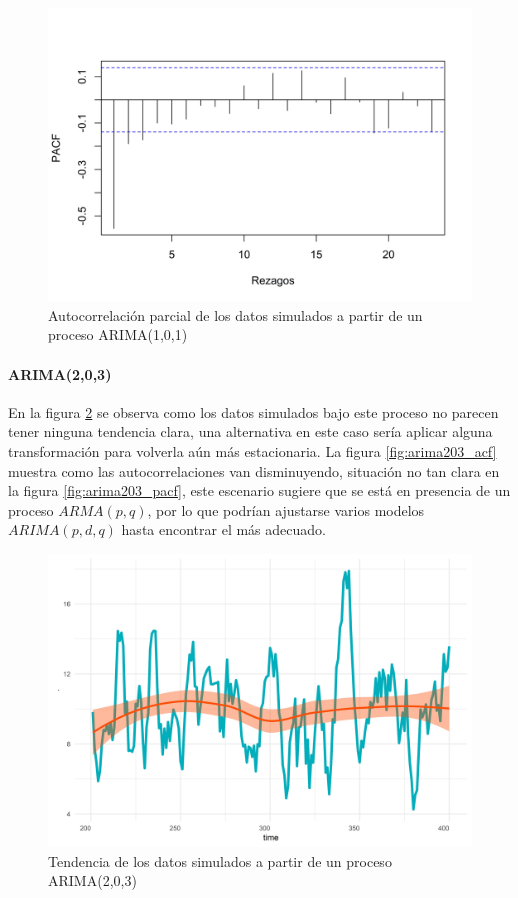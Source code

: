 \documentclass[
]{article}
\begin{document}
\begin{figure}[H]
\includegraphics[width=1\linewidth,height=1\textheight]{Tesis_files/figure-latex/arima101_pacf-1} \caption{Autocorrelación parcial de los datos simulados a partir de un proceso ARIMA(1,0,1)}\label{fig:arima101_pacf}
\end{figure}

\paragraph{ARIMA(2,0,3)}

En la figura \ref{fig:arima203_comportamiento} se observa como los datos
simulados bajo este proceso no parecen tener ninguna tendencia clara,
una alternativa en este caso sería aplicar alguna transformación para
volverla aún más estacionaria. La figura \ref{fig:arima203_acf} muestra
como las autocorrelaciones van disminuyendo, situación no tan clara en
la figura \ref{fig:arima203_pacf}, este escenario sugiere que se está en
presencia de un proceso \(ARMA(p,q)\), por lo que podrían ajustarse
varios modelos \(ARIMA(p,d,q)\) hasta encontrar el más adecuado.

\begin{figure}[H]
\includegraphics[width=1\linewidth,height=1\textheight]{Tesis_files/figure-latex/arima203_comportamiento-1} \caption{Tendencia de los datos simulados a partir de un proceso ARIMA(2,0,3)}\label{fig:arima203_comportamiento}
\end{figure}
\end{document}
